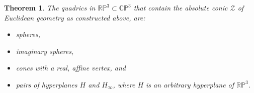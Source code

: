 \documentclass[10pt, a4paper]{article}
\theoremstyle{BoldTopSpacing}
\newtheorem{theorem}{Theorem}[section]
\theoremstyle{BoldTopSpacing}
\theoremstyle{BoldTopSpacing}
\theoremstyle{BoldTopBottomSpacing}
\theoremstyle{BoldTopSpacing}
\theoremstyle{BoldTopBottomSpacing}
\theoremstyle{remark}
\begin{document}
\begin{theorem}
\label{thm:quadrics-contain-absolute}
The quadrics in $\mathbb{R}\mathbb{P}^3 \subset \mathbb{C}\mathbb{P}^3$ that contain the absolute conic $\mathcal{Z}$ of Euclidean geometry \textemdash as constructed above, are:
\begin{itemize}[label=$\blacktriangleright$]
    \item spheres,
    \item imaginary spheres,
    \item cones with a real, affine vertex, and
    \item pairs of hyperplanes $H$ and $H_{\infty}$, where $H$ is an arbitrary hyperplane of $\mathbb{R}\mathbb{P}^3$.
\end{itemize}
\end{theorem}
\end{document}
